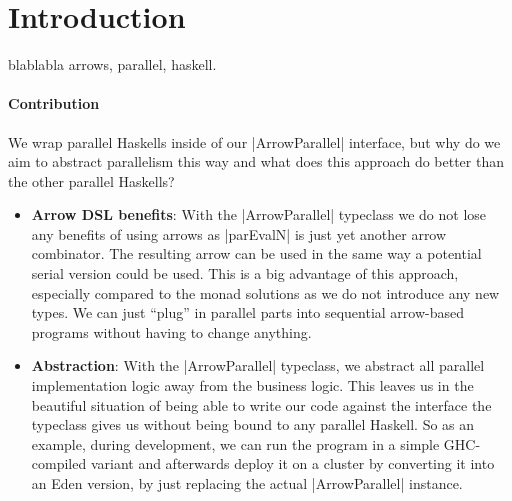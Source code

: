 
\section{Introduction}
\label{sec:introduction}

blablabla arrows, parallel, haskell.

\paragraph{Contribution}


We wrap parallel Haskells inside of our |ArrowParallel| interface, but why do we aim to abstract parallelism this way and what does this approach do better than the other parallel Haskells?
\begin{itemize}
	\item \textbf{Arrow DSL benefits}:
	With the |ArrowParallel| typeclass we do not lose any benefits of using arrows as |parEvalN| is just yet another arrow combinator. The resulting arrow can be used in the same way a potential serial version could be used. This is a big advantage of this approach, especially compared to the monad solutions as we do not introduce any new types. We can just \enquote{plug} in parallel parts into sequential arrow-based programs without having to change anything.
	\item \textbf{Abstraction}:
	With the |ArrowParallel| typeclass, we abstract all parallel implementation logic away from the business logic. This leaves us in the beautiful situation of being able to write our code against the interface the typeclass gives us without being bound to any parallel Haskell. So as an example, during development, we can run the program in a simple GHC-compiled variant and afterwards deploy it on a cluster by converting it into an Eden version, by just replacing the actual |ArrowParallel| instance.
\end{itemize}


